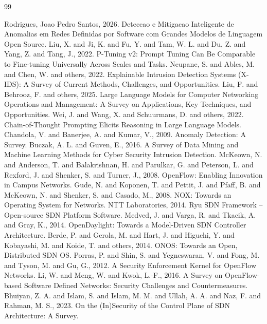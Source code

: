 \documentclass[12pt,a4paper]{article}
\begin{document}

\begin{thebibliography}{99}
\raggedright
{} Rodrigues, Joao Pedro Santos, 2026. Deteccao e Mitigacao Inteligente de Anomalias em Redes Definidas por Software com Grandes Modelos de Linguagem Open Source.
 Liu, X. and Ji, K. and Fu, Y. and Tam, W. L. and Du, Z. and Yang, Z. and Tang, J., 2022. P-Tuning v2: Prompt Tuning Can Be Comparable to Fine-tuning Universally Across Scales and Tasks.
 Neupane, S. and Ables, M. and Chen, W. and others, 2022. Explainable Intrusion Detection Systems (X-IDS): A Survey of Current Methods, Challenges, and Opportunities.
 Liu, F. and Behrooz, F. and others, 2025. Large Language Models for Computer Networking Operations and Management: A Survey on Applications, Key Techniques, and Opportunities.
 Wei, J. and Wang, X. and Schuurmans, D. and others, 2022. Chain-of-Thought Prompting Elicits Reasoning in Large Language Models.
 Chandola, V. and Banerjee, A. and Kumar, V., 2009. Anomaly Detection: A Survey.
 Buczak, A. L. and Guven, E., 2016. A Survey of Data Mining and Machine Learning Methods for Cyber Security Intrusion Detection.
 McKeown, N. and Anderson, T. and Balakrishnan, H. and Parulkar, G. and Peterson, L. and Rexford, J. and Shenker, S. and Turner, J., 2008. OpenFlow: Enabling Innovation in Campus Networks.
 Gude, N. and Koponen, T. and Pettit, J. and Pfaff, B. and McKeown, N. and Shenker, S. and Casado, M., 2008. NOX: Towards an Operating System for Networks.
 NTT Laboratories, 2014. Ryu SDN Framework -- Open-source SDN Platform Software.
 Medved, J. and Varga, R. and Tkacik, A. and Gray, K., 2014. OpenDaylight: Towards a Model-Driven SDN Controller Architecture.
 Berde, P. and Gerola, M. and Hart, J. and Higuchi, Y. and Kobayashi, M. and Koide, T. and others, 2014. ONOS: Towards an Open, Distributed SDN OS.
 Porras, P. and Shin, S. and Yegneswaran, V. and Fong, M. and Tyson, M. and Gu, G., 2012. A Security Enforcement Kernel for OpenFlow Networks.
 Li, W. and Meng, W. and Kwok, L.-F., 2016. A Survey on OpenFlow-based Software Defined Networks: Security Challenges and Countermeasures.
 Bhuiyan, Z. A. and Islam, S. and Islam, M. M. and Ullah, A. A. and Naz, F. and Rahman, M. S., 2023. On the (In)Security of the Control Plane of SDN Architecture: A Survey.

\end{thebibliography}
\end{document}
